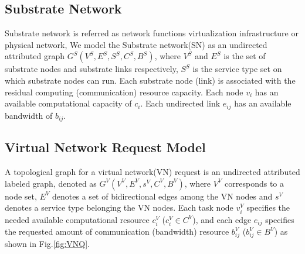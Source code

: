



\subsection{Substrate Network}
Substrate network is referred as network functions virtualization infrastructure or physical network,  We model the Substrate network(SN) as an undirected attributed graph $G^S (V^S,E^S,S^S,C^S,B^S)$, where $V^S$ and $E^S$ is the set of substrate nodes and substrate links respectively, $S^S$ is the service type set on which substrate nodes can run. Each substrate node (link) is associated with the residual computing (communication) resource capacity. Each node $v_i$ has an available computational capacity of $c_i$. Each undirected link $e_{ij}$ has an available bandwidth of $b_{ij}$.

\subsection{Virtual Network Request Model}
A topological graph for a virtual network(VN) request is an undirected attributed labeled graph, denoted as $G^V (V^V,E^V,s^V,C^V,B^V)$, where $V^V$ corresponds to a node set, $E^V$ denotes a set of bidirectional edges among the VN nodes and $s^V$ denotes a service type belonging the VN nodes. Each task node $v_i^V$ specifies the needed available computational resource $c_i^V$ ($c_i^V \in C^V$), and each edge $e_{ij}$ specifies the requested amount of communication (bandwidth) resource $b_{ij}^V$ ($b_{ij}^V \in B^V$) as shown in Fig.\ref{fig:VNQ}.


